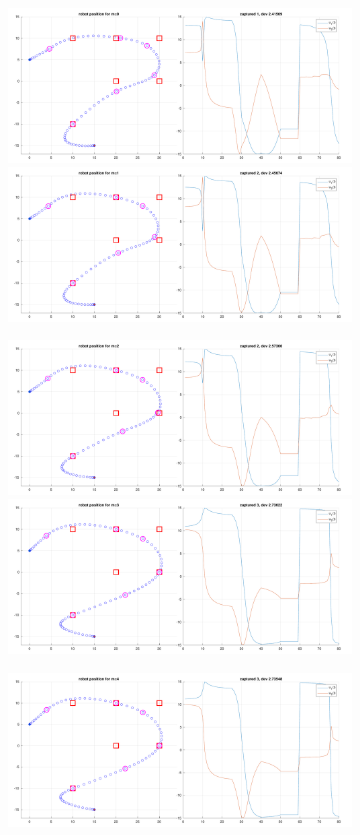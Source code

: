 \begin{figure}[!htb]
    \caption{Robot positions and control signal for Task 11.}
    \label{fig:task11:graphs}
    \begin{subfigure}
        \centering
        \includegraphics[width=0.5\linewidth]{part1/figures/task11/task_11_0.pdf}\hspace{0em}
        \includegraphics[width=0.5\linewidth]{part1/figures/task11/task_11_1.pdf}
    \end{subfigure}
    \begin{subfigure}
        \centering
        \includegraphics[width=0.5\linewidth]{part1/figures/task11/task_11_2.pdf}\hspace{0em}
        \includegraphics[width=0.5\linewidth]{part1/figures/task11/task_11_3.pdf}
    \end{subfigure}
    \begin{subfigure}
        \centering
        \includegraphics[width=0.5\linewidth]{part1/figures/task11/task_11_4.pdf}\hspace{0em}

\end{subfigure}
\end{figure}
